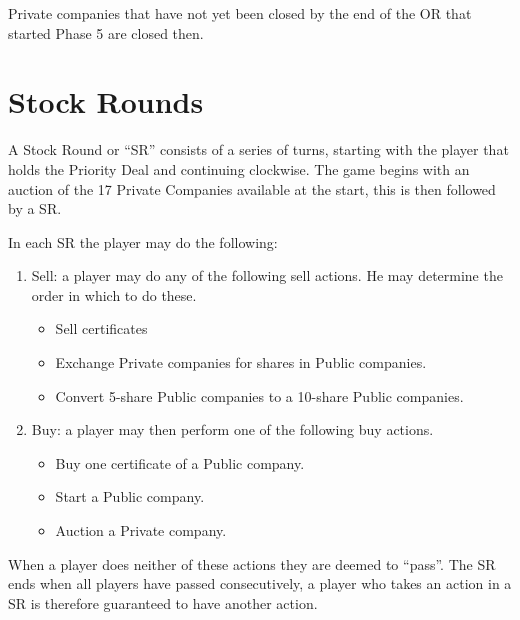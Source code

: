 \documentclass[a4paper,twocolumn]{article}
\begin{document}
Private companies that have not yet been closed by the end of the OR that
started Phase 5 are closed then.

\section{Stock Rounds}
A Stock Round or ``SR'' consists of a series of turns, starting with the player
that holds the Priority Deal and continuing clockwise. The game begins with an
auction of the 17 Private Companies available at the start, this is then
followed by a SR.

In each SR the player may do the following:
\begin{enumerate}
	\item Sell: a player may do any of the following sell actions. He may
	determine the order in which to do these.
	\begin{itemize}
		\item Sell certificates
		\item Exchange Private companies for shares in Public companies.
		\item Convert 5-share Public companies to a 10-share Public companies.
	\end{itemize}
	\item Buy: a player may then perform one of the following buy actions.
	\begin{itemize}
		\item Buy one certificate of a Public company.
		\item Start a Public company.
		\item Auction a Private company.
	\end{itemize}
\end{enumerate}

When a player does neither of these actions they are deemed to ``pass''. The
SR ends when all players have passed consecutively, a player who takes an action
in a SR is therefore guaranteed to have another action.
\end{document}
